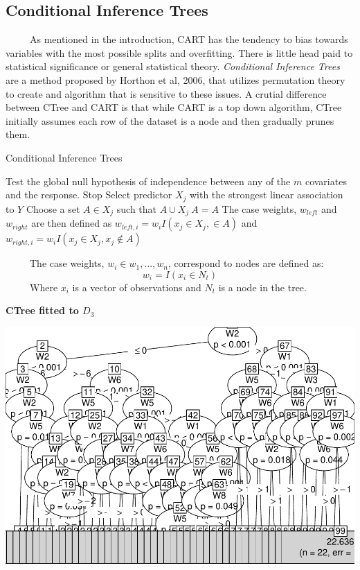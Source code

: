 \documentclass[12pt,twoside]{reedthesis}
\begin{document}
  \subsection{Conditional Inference
  Trees}\label{conditional-inference-trees}
  
  ~~~~~As mentioned in the introduction, CART has the tendency to bias
  towards variables with the most possible splits and overfitting. There
  is little head paid to statistical significance or general statistical
  theory. \emph{Conditional Inference Trees} are a method proposed by
  Horthon et al, 2006, that utilizes permutation theory to create and
  algorithm that is sensitive to these issues. A crutial difference
  between CTree and CART is that while CART is a top down algorithm, CTree
  initially assumes each row of the dataset is a node and then gradually
  prunes them.
  
  \begin{algorithm}
  \caption{Conditional Inference Trees}
  \label{ctree}
  \begin{algorithmic}[1]
  \State Test the global null hypothesis of independence between any of the $m$ covariates and the response. 
  \State Stop 
  \Else \State Select predictor $X_j$ with the strongest linear association to $Y$ 
  \EndIf
  \State Choose a set $A \in X_j$ such that $A \cup X_j \ A = A$ 
  \State The case weights, $w_{left}$ and $w_{right}$ are then defined as $w_{left,i} = w_i I (x_j \in X_j, \in A)$ and $w_{right,i} = w_i I(x_j \in X_j, x_j \notin A)$
  \EndFor
  \end{algorithmic}
  \end{algorithm}
  
  ~~~~~The case weights, \(w_i \in {w_1,..., w_n}\), correspond to nodes
  are defined as:\[w_i = I(x_i \in {N_t})\] ~~~~~Where \(x_i\) is a vector
  of observations and \(N_t\) is a node in the tree.
  
  \textbf{CTree fitted to \(D_3\)}
  
  \begin{center}\includegraphics{Thesis_files/figure-latex/ctree-1} \end{center}
  
\end{document}
